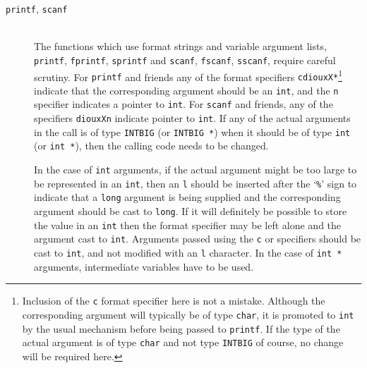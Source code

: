 \documentclass[twoside,11pt]{article}
\renewcommand{\_}{\texttt{\symbol{95}}}
\newcommand{\cc}[1]{{\tt #1}}
\newcommand{\ditem}[1]{\item[#1]\mbox{}\\}
\begin{document}
\begin{description}
\begin{description}
%
\ditem{\cc{printf}, \cc{scanf}}
The functions which use format strings and variable argument lists,
\cc{printf}, \cc{fprintf}, \cc{sprintf} and 
\cc{scanf}, \cc{fscanf}, \cc{sscanf},
require careful scrutiny.
For \cc{printf} and friends 
any of the format specifiers \cc{cdiouxX*}\footnote{
   Inclusion of the \cc{c} format specifier here is not a mistake.
   Although the corresponding argument will typically be of type \cc{char},
   it is promoted to \cc{int} by the usual mechanism before being 
   passed to \cc{printf}.  If the type of the actual argument is
   of type \cc{char} and not type \cc{INT\_BIG} of course, no change 
   will be required here.
}
indicate that the corresponding argument should be an \cc{int},
and the \cc{n} specifier indicates a pointer to \cc{int}.
For \cc{scanf} and friends, any of the specifiers \cc{diouxXn} indicate
pointer to \cc{int}.
If any of the actual arguments in the call is of type \cc{INT\_BIG} 
(or \cc{INT\_BIG~*}) when it should be of type \cc{int} (or \cc{int~*}),
then the calling code needs to be changed.

In the case of \cc{int} arguments, if the actual argument
might be too large to be
represented in an \cc{int}, then an \cc{l} should be inserted 
after the `{\tt\%}' sign to 
indicate that a \cc{long} argument is being supplied and the 
corresponding argument should be cast to \cc{long}.  If it will definitely
be possible to store the value in an \cc{int} then the format specifier
may be left alone and the argument cast to \cc{int}.
Arguments passed using the \cc{c} or \cc{*} specifiers should be cast 
to \cc{int}, and not modified with an \cc{l} character.
In the case of \cc{int~*} arguments, intermediate variables have to be used.


\end{description}
\end{description}
\end{document}
